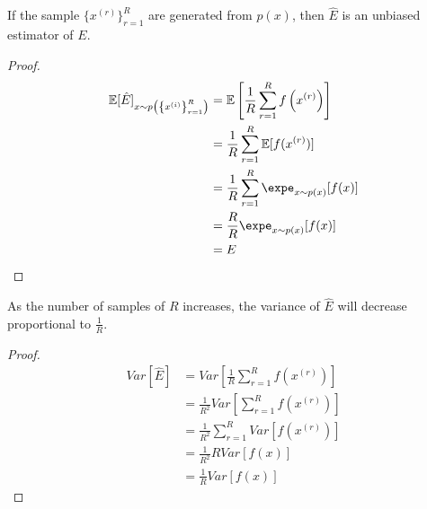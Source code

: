 \documentclass{article}
\begin{document}
	\begin{proposition}
		If the sample $\{x^{(r)}\}_{r=1}^R$ are generated from $p(x)$, then $\hat{E}$ is an unbiased estimator of $E$.
	\end{proposition}
	
	\begin{proof}
		\begin{align}
			\mathbb{E}[\hat{E}]_{x \sim p\left(\left\{x^{(i)}\right\}_{r=1}^{R}\right)}
			&= \mathbb{E}\left[\frac{1}{R} \sum_{r=1}^{R} f\left(x^{(r)}\right)\right] \\
			&= \frac{1}{R} \sum_{r=1}^R \expect{f(x^{(r)})} \\
			&= \frac{1}{R} \sum_{r=1}^{R} \expe_{x \sim p(x)}[f(x)] \\
			&= \frac{R}{R} \expe_{x \sim p(x)}[f(x)] \\
			&= E
		\end{align}
	\end{proof}
	
	\begin{proposition}
		As the number of samples of $R$ increases, the variance of $\hat{E}$ will decrease proportional to $\frac{1}{R}$.
	\end{proposition}
	
	\begin{proof}
		\begin{align}
			Var[\hat{E}] &= Var[\frac{1}{R} \sum_{r=1}^R f(x^{(r)})] \\
			&= \frac{1}{R^2} Var[\sum_{r=1}^R f(x^{(r)})] \\
			&= \frac{1}{R^2} \sum_{r=1}^R Var[f(x^{(r)})] \\
			&= \frac{1}{R^2} R Var[f(x)] \\
			&= \frac{1}{R} Var[f(x)]
		\end{align}
	\end{proof}
\end{document}

